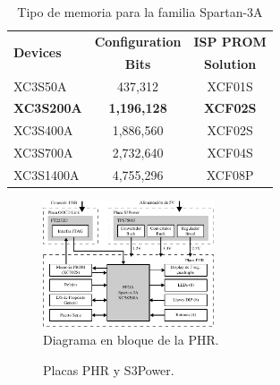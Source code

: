 \documentclass[conference]{IEEEtran}
\begin{document}
\begin{table}[!t]
\renewcommand{\arraystretch}{1.3}
\caption{Tipo de memoria para la familia Spartan-3A}
\label{tab:mem-fpga}
\centering
\begin{tabular}{|l|c|c|}
\hline
\multirow{2}{*}{\textbf{Devices}} & \textbf{Configuration} & \textbf{ISP PROM} \\
 & \textbf{Bits} & \textbf{Solution} \\
\hline
XC3S50A   & 437,312   & XCF01S \\
\hline                        
\textbf{XC3S200A}  & \textbf{1,196,128} & \textbf{XCF02S} \\
\hline                        
XC3S400A  & 1,886,560 & XCF02S \\
\hline                        
XC3S700A  & 2,732,640 & XCF04S \\
\hline
XC3S1400A & 4,755,296 & XCF08P     \\
\hline
\end{tabular}
\end{table}

\begin{figure}[!t]
\centering
  \includegraphics[width=0.45\textwidth]{img/block}
  \caption{Diagrama en bloque de la PHR.}
  \label{fig:phr-bloque}
\end{figure}


\begin{figure}[!t]
  \centering
  \hfil
  \hfil
  \caption{Placas PHR y S3Power.}
  \label{fig:placas-phr-s3power-con}
\end{figure}
\end{document}
